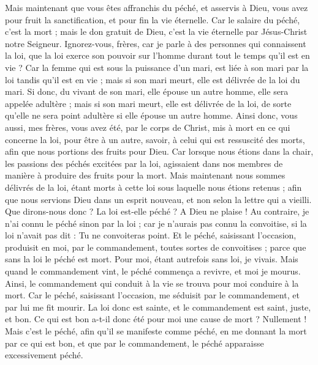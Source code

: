 \begin{multicols}{2}
Mais maintenant que vous êtes affranchis du péché, et asservis à Dieu, vous avez pour fruit la sanctification, et pour fin la vie éternelle.
Car le salaire du péché, c'est la mort ; mais le don gratuit de Dieu, c'est la vie éternelle par Jésus-Christ notre Seigneur.
\VerseOne{}Ignorez-vous, frères, car je parle à des personnes qui connaissent la loi, que la loi exerce son pouvoir sur l’homme durant tout le temps qu’il est en vie ?
Car la femme qui est sous la puissance d'un mari, est liée à son mari par la loi tandis qu'il est en vie ; mais si son mari meurt, elle est délivrée de la loi du mari.
Si donc, du vivant de son mari, elle épouse un autre homme, elle sera appelée adultère ; mais si son mari meurt, elle est délivrée de la loi, de sorte qu'elle ne sera point adultère si elle épouse un autre homme.
Ainsi donc, vous aussi, mes frères, vous avez été, par le corps de Christ, mis à mort en ce qui concerne la loi, pour être à un autre, savoir, à celui qui est ressuscité des morts, afin que nous portions des fruits pour Dieu.
Car lorsque nous étions dans la chair, les passions des péchés excitées par la loi, agissaient dans nos membres de manière à produire des fruits pour la mort.
Mais maintenant nous sommes délivrés de la loi, étant morts à cette loi sous laquelle nous étions retenus ; afin que nous servions Dieu dans un esprit nouveau, et non selon la lettre qui a vieilli.
Que dirons-nous donc ? La loi est-elle péché ? A Dieu ne plaise ! Au contraire, je n'ai connu le péché sinon par la loi ; car je n’aurais pas connu la convoitise, si la loi n’avait pas dit : Tu ne convoiteras point.
Et le péché, saisissant l’occasion, produisit en moi, par le commandement, toutes sortes de convoitises ; parce que sans la loi le péché est mort.
Pour moi, étant autrefois sans loi, je vivais. Mais quand le commandement vint, le péché commença a revivre, et moi je mourus.
Ainsi, le commandement qui conduit à la vie se trouva pour moi conduire à la mort.
Car le péché, saisissant l’occasion, me séduisit par le commandement, et par lui me fit mourir.
La loi donc est sainte, et le commandement est saint, juste, et bon.
Ce qui est bon a-t-il donc été pour moi une cause de mort ? Nullement ! Mais c’est le péché, afin qu'il se manifeste comme péché, en me donnant la mort par ce qui est bon, et que par le commandement, le péché apparaisse excessivement péché.

\end{multicols}
